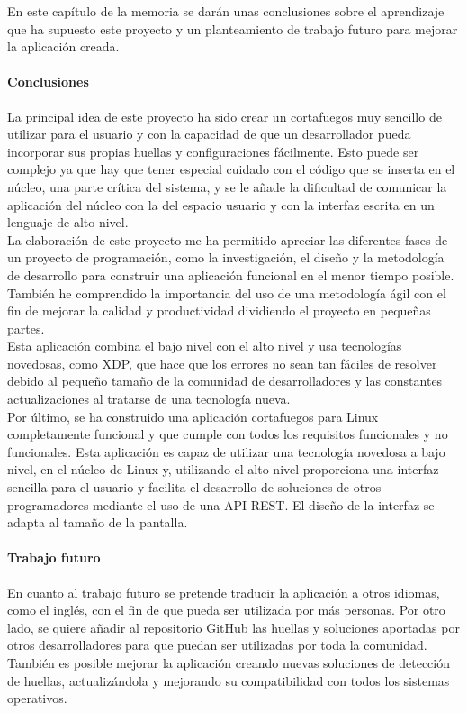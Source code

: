 En este capítulo de la memoria se darán unas conclusiones sobre el aprendizaje que ha supuesto este proyecto y un planteamiento de trabajo futuro para mejorar la aplicación creada.

\paragraph{Conclusiones}
La principal idea de este proyecto ha sido crear un cortafuegos muy sencillo de utilizar para el usuario y con la capacidad de que un desarrollador pueda incorporar sus propias huellas y configuraciones fácilmente. Esto puede ser complejo ya que hay que tener especial cuidado con el código que se inserta en el núcleo, una parte crítica del sistema, y se le añade la dificultad de comunicar la aplicación del núcleo con la del espacio usuario y con la interfaz escrita en un lenguaje de alto nivel.
\\La elaboración de este proyecto me ha permitido apreciar las diferentes fases de un proyecto de programación, como la investigación, el diseño y la metodología de desarrollo para construir una aplicación funcional en el menor tiempo posible. También he comprendido la importancia del uso de una metodología ágil con el fin de mejorar la calidad y productividad dividiendo el proyecto en pequeñas partes.
\\Esta aplicación combina el bajo nivel con el alto nivel y usa tecnologías novedosas, como XDP, que hace que los errores no sean tan fáciles de resolver debido al pequeño tamaño de la comunidad de desarrolladores y las constantes actualizaciones al tratarse de una tecnología nueva.
\\Por último, se ha construido una aplicación cortafuegos para Linux completamente funcional y que cumple con todos los requisitos funcionales y no funcionales. Esta aplicación es capaz de utilizar una tecnología novedosa a bajo nivel, en el núcleo de Linux y, utilizando el alto nivel proporciona una interfaz sencilla para el usuario y facilita el desarrollo de soluciones de otros programadores mediante el uso de una API REST. El diseño de la interfaz se adapta al tamaño de la pantalla.

\paragraph{Trabajo futuro}
En cuanto al trabajo futuro se pretende traducir la aplicación a otros idiomas, como el inglés, con el fin de que pueda ser utilizada por más personas. Por otro lado, se quiere añadir al repositorio GitHub las huellas y soluciones aportadas por otros desarrolladores para que puedan ser utilizadas por toda la comunidad. También es posible mejorar la aplicación creando nuevas soluciones de detección de huellas, actualizándola y mejorando su compatibilidad con todos los sistemas operativos.